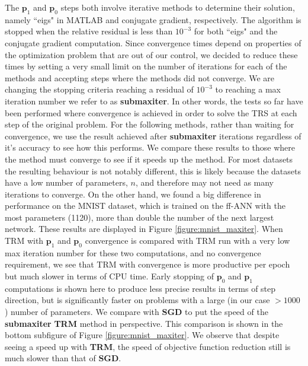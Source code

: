 \documentclass[letterpaper,12pt,titlepage,oneside,final]{book}
\begin{document}
	The $\mathbf{p}_{1}$ and $\mathbf{p}_{0}$ steps both involve iterative methods to determine their solution, namely ``eigs" in MATLAB and conjugate gradient, respectively. The algorithm is stopped when the relative residual is less than $10^{-3}$ for both ``eigs" and the conjugate gradient computation. Since convergence times depend on properties of the optimization problem that are out of our control, we decided to reduce these times by setting a very small limit on the number of iterations for each of the methods and accepting steps where the methods did not converge. We are changing the stopping criteria reaching a residual of $10^{-3}$ to reaching a max iteration number we refer to as \textbf{submaxiter}. In other words, the tests so far have been performed where convergence is achieved in order to solve the TRS at each step of the original problem. For the following methods, rather than waiting for convergence, we use the result achieved after \textbf{submaxiter} iterations regardless of it's accuracy to see how this performs. We compare these results to those where the method must converge to see if it speeds up the method. For most datasets the resulting behaviour is not notably different, this is likely because the datasets have a low number of parameters, $n$, and therefore may not need as many iterations to converge. On the other hand, we found a big difference in performance on the MNIST dataset, which is trained on the ff-ANN with the most parameters (1120), more than double the number of the next largest network. These results are displayed in Figure \ref{figure:mnist_maxiter}. When TRM with $\mathbf{p}_{1}$ and $\mathbf{p}_{0}$ convergence is compared with TRM run with a very low max iteration number for these two computations, and no convergence requirement, we see that TRM with convergence is more productive per epoch but much slower in terms of CPU time. Early stopping of $\mathbf{p}_{0}$ and $\mathbf{p}_{1}$ computations is shown here to produce less precise results in terms of step direction, but is significantly faster on problems with a large (in our case $>1000$) number of parameters. We compare with \textbf{SGD} to put the speed of the \textbf{submaxiter} \textbf{TRM} method in perspective. This comparison is shown in the bottom subfigure of Figure \ref{figure:mnist_maxiter}. We observe that despite seeing a speed up with \textbf{TRM}, the speed of objective function reduction still is much slower than that of \textbf{SGD}.
	
\end{document}
